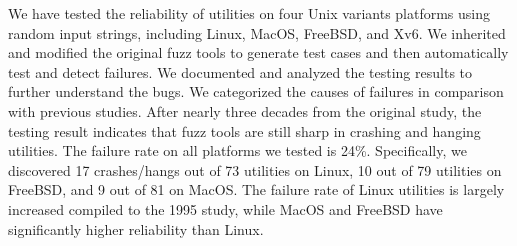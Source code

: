 We have tested the reliability of utilities on four Unix variants platforms using random input strings, including Linux, MacOS, FreeBSD, and Xv6. We inherited and modified the original fuzz tools to generate test cases and then automatically test and detect failures. We documented and analyzed the testing results to further understand the bugs. We categorized the causes of failures in comparison with previous studies. After nearly three decades from the original study, the testing result indicates that fuzz tools are still sharp in crashing and hanging utilities. The failure rate on all platforms we tested is 24\%. 
Specifically, we discovered 17 crashes/hangs out of 73 utilities on Linux, 10 out of 79 utilities on FreeBSD, and 9 out of 81 on MacOS. The failure rate of Linux utilities is largely increased compiled to the 1995 study, while MacOS and FreeBSD have significantly higher reliability than Linux. 